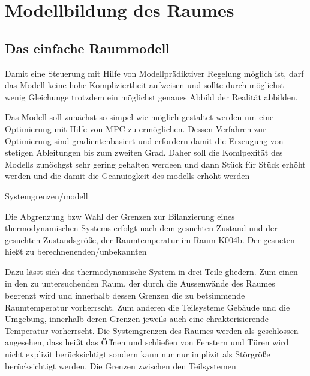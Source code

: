 %
%

\chapter{Modellbildung des Raumes}
\label{chap:modellbildung}

\renewcommand{\chapterheadstartvskip}{\vspace*{-0.5cm}}

\section{Das einfache Raummodell}

Damit eine Steuerung mit Hilfe von Modellprädiktiver Regelung möglich ist, darf das Modell keine hohe Kompliziertheit aufweisen und sollte durch möglichst wenig Gleichunge trotzdem ein möglichst genaues Abbild der Realität abbilden.

Das Modell soll zunächst so simpel wie möglich gestaltet werden um eine Optimierung mit Hilfe von MPC zu ermöglichen. Dessen Verfahren zur Optimierung sind gradientenbasiert und erfordern damit die Erzeugung von stetigen Ableitungen bis zum zweiten Grad. Daher soll die Komlpexität des Modells zunöchgst sehr gering gehalten werdeen und dann Stück für Stück erhöht werden und die damit die Geanuiogkeit des modells erhöht werden

Systemgrenzen/modell



Die Abgrenzung bzw Wahl der Grenzen zur Bilanzierung eines thermodynamischen Systems erfolgt nach dem gesuchten Zustand und der gesuchten Zustandsgröße, der Raumtemperatur im Raum K004b. Der gesucten hießt zu berechnenenden/unbekannten

Dazu lässt sich das thermodynamische System in drei Teile gliedern. Zum einen in den zu untersuchenden Raum, der durch die Aussenwände des Raumes begrenzt wird und innerhalb dessen Grenzen die zu betsimmende Raumtemperatur vorherrscht. Zum anderen die Teilsysteme Gebäude und die Umgebung, innerhalb deren Grenzen jeweils auch eine chrakterisierende Temperatur vorherrscht. Die Systemgrenzen des Raumes werden als geschlossen angesehen, dass heißt das Öffnen und schließen von Fenstern und Türen wird nicht explizit berücksichtigt sondern kann nur nur implizit als Störgröße berücksichtigt werden. Die Grenzen zwischen den Teilsystemen 

